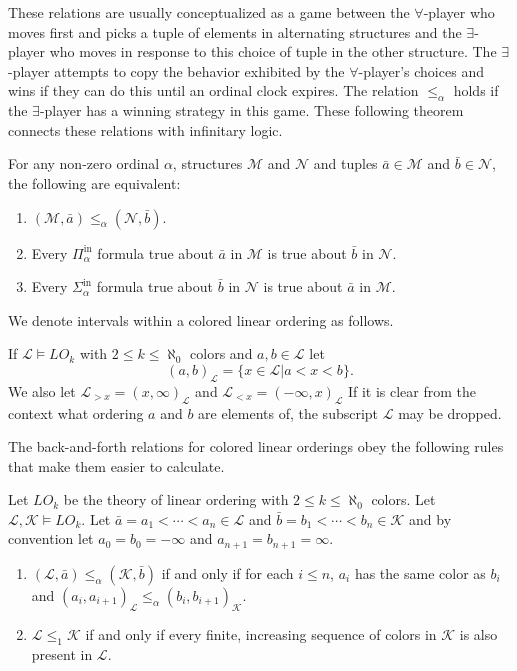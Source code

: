 \documentclass[11pt]{amsart}
\newcommand{\mc}[1]{\mathcal{#1}}
\newcommand{\Pinf}[1]{\Pi^{\mathrm{in}}_{#1}}
\newcommand{\Sinf}[1]{\Sigma^{\mathrm{in}}_{#1}}
\theoremstyle{remark}
\begin{document}
These relations are usually conceptualized as a game between the $\forall$-player who moves first and picks a tuple of elements in alternating structures and the $\exists$-player who moves in response to this choice of tuple in the other structure.
The $\exists$-player attempts to copy the behavior exhibited by the $\forall$-player's choices and wins if they can do this until an ordinal clock expires.
The relation $\leq_\alpha$ holds if the $\exists$-player has a winning strategy in this game.
These following theorem connects these relations with infinitary logic.

\begin{theorem}
For any non-zero ordinal $\alpha$, structures $\mc{M}$ and $\mc{N}$ and tuples $\bar{a}\in\mc{M}$ and $\bar{b}\in\mc{N}$, the following are equivalent:
    \begin{enumerate}
	\item $(\mc{M},\bar{a})\leq_\alpha (\mc{N},\bar{b})$.
	\item Every $\Pinf{\alpha}$ formula true about $\bar{a}$ in $\mc{M}$ is true about $\bar{b}$ in $\mc{N}$.
	\item Every $\Sinf{\alpha}$ formula true about $\bar{b}$ in $\mc{N}$ is true about $\bar{a}$ in $\mc{M}$.
    \end{enumerate} 
\end{theorem}

We denote intervals within a colored linear ordering as follows.
\begin{definition}
    If $\mc{L}\models LO_k$ with $2\leq k\leq\aleph_0$ colors and $a,b\in\mc{L}$ let
    \[(a,b)_\mc{L}=\{x\in\mc{L}|a<x<b\}.\]
    We also let $\mc{L}_{>x}=(x,\infty)_\mc{L}$ and $\mc{L}_{<x}=(-\infty,x)_\mc{L}$
    If it is clear from the context what ordering $a$ and $b$ are elements of, the subscript $\mc{L}$ may be dropped.

\end{definition}

The back-and-forth relations for colored linear orderings obey the following rules that make them easier to calculate.


\begin{lemma}\label{lem:colorHelper}
    Let $LO_k$ be the theory of linear ordering with $2\leq k\leq\aleph_0$ colors. Let $\mc{L},\mc{K}\models LO_k$. Let $\bar{a}=a_1<\cdots<a_n\in\mc{L}$ and $\bar{b}=b_1<\cdots<b_n\in\mc{K}$ and by convention let $a_0=b_0=-\infty$ and $a_{n+1}=b_{n+1}=\infty$.
    \begin{enumerate}
        \item $(\mc{L},\bar{a})\leq_\alpha (\mc{K},\bar{b})$ if and only if for each $i\leq n$, $a_i$ has the same color as $b_i$ and $(a_i,a_{i+1})_{\mc{L}}\leq_\alpha (b_i,b_{i+1})_{\mc{K}}$.
        \item $\mc{L}\leq_1\mc{K}$ if and only if every finite, increasing sequence of colors in $\mc{K}$ is also present in $\mc{L}$.
    \end{enumerate}
    
\end{lemma}
\end{document}
